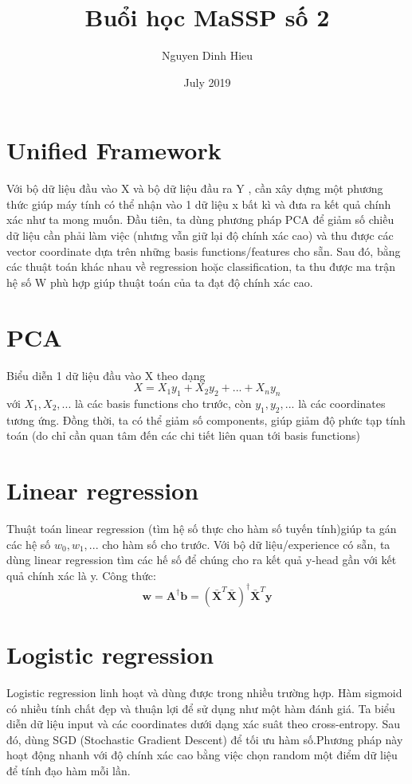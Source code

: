 \documentclass{article}
\title{Buổi học MaSSP số 2}
\date{July 2019}
\begin{document}
\maketitle
\author{Nguyen Dinh Hieu}

\section{Unified Framework}


\textrm{Với bộ dữ liệu đầu vào X và bộ dữ liệu đầu ra Y , cần xây dựng một phương thức giúp máy tính có thể nhận vào 1 dữ liệu x bất kì và đưa ra kết quả chính xác như ta mong muốn. 
Đầu tiên, ta dùng phương pháp PCA để giảm số chiều dữ liệu cần phải làm việc (nhưng vẫn giữ lại độ chính xác cao) và thu được các vector coordinate dựa trên những basis functions/features cho sẵn. Sau đó, bằng các thuật toán khác nhau về regression hoặc classification, ta thu được ma trận hệ số W phù hợp giúp thuật toán của ta đạt độ chính xác cao. }

\section{PCA}
\textrm{Biểu diễn 1 dữ liệu đầu vào X theo dạng
$$X = X_1 y_1 + X_2 y_2  + ... + X_n y_n $$
với {$X_1 , X_2, ...$} là các basis functions cho trước, còn {$y_1, y_2, ...$} là các coordinates tương ứng. Đồng thời, ta có thể giảm số components, giúp giảm độ phức tạp tính toán (do chỉ cần quan tâm đến các chi tiết liên quan tới basis functions)}

\section{Linear regression}
Thuật toán linear regression (tìm hệ số thực cho hàm số tuyến tính)giúp ta gán các hệ số {$w_0, w_1,...$} cho hàm số cho trước. Với bộ dữ liệu/experience có sẵn, ta dùng linear regression tìm các hế số để chúng cho ra kết quả y-head gần với kết quả chính xác là y.
Công thức:
$$\mathbf{w} = \mathbf{A}^{\dagger}\mathbf{b} = (\mathbf{\bar{X}}^T\mathbf{\bar{X}})^{\dagger} \mathbf{\bar{X}}^T\mathbf{y}$$

\section{Logistic regression}
Logistic regression linh hoạt và dùng được trong nhiều trường hợp. Hàm sigmoid có nhiều tính chất đẹp và thuận lợi để sử dụng như một hàm đánh giá. Ta biểu diễn dữ liệu input và các coordinates dưới dạng xác suât theo cross-entropy. Sau đó, dùng SGD (Stochastic Gradient Descent) để tối ưu hàm số.Phương pháp này hoạt động nhanh với độ chính xác cao bằng việc chọn random một điểm dữ liệu để tính đạo hàm mỗi lần.
\end{document}
